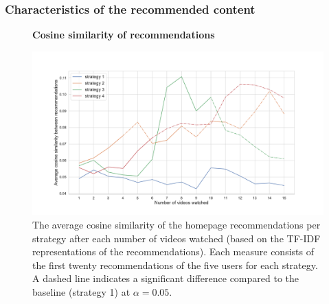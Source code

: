 \documentclass[../main.tex]{subfiles}
\begin{document}
\subsubsection{Characteristics of the recommended content}
\begin{figure}
  \textbf{Cosine similarity of recommendations}\par\medskip
  \centering
  \includegraphics[keepaspectratio, width=\textwidth]{images/All sim.pdf}
  \caption{The average cosine similarity of the homepage recommendations per strategy after each number of videos watched (based on the TF-IDF representations of the recommendations). Each measure consists of the first twenty recommendations of the five users for each strategy. A dashed line indicates a significant difference compared to the baseline (strategy 1) at $\alpha = 0.05$.}
  \label{fig:similarities}


\end{figure}
\end{document}
